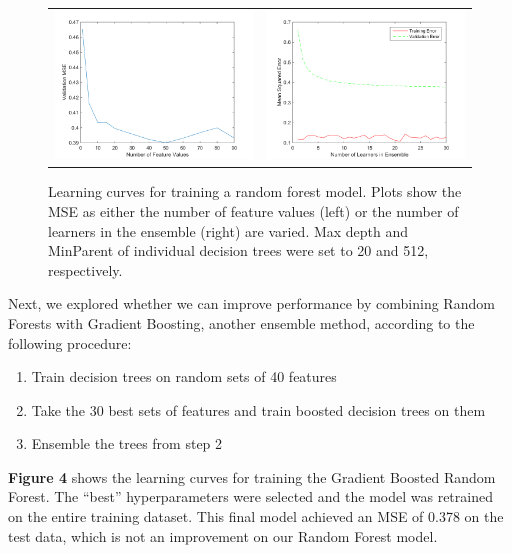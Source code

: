 \documentclass[12pt] {article}
\renewcommand{\baselinestretch}{1.2} %
\begin{document}
\renewcommand{\baselinestretch}{1.0} %
\begin{figure}[h!] \centering
\begin{tabular}{cc}
\includegraphics[width=.45\textwidth]{figdir/numFeatValuesVersusMSE.png} &
\includegraphics[width=.45\textwidth]{figdir/numLearnersVersusMSE.png} \\
\end{tabular}
\caption{Learning curves for training a random forest model. Plots show the MSE as either the number of feature values (left) or the number of learners in the ensemble (right) are varied. Max depth and MinParent of individual decision trees were set to 20 and 512, respectively.}
\end{figure}
\renewcommand{\baselinestretch}{1.2} %

Next, we explored whether we can improve performance by combining Random Forests with Gradient Boosting, another ensemble method, according to the following procedure:
\begin{enumerate}
\item Train decision trees on random sets of 40 features
\item Take the 30 best sets of features and train boosted decision trees on them
\item Ensemble the trees from step 2
\end{enumerate}

\textbf{Figure 4} shows the learning curves for training the Gradient Boosted Random Forest. The ``best'' hyperparameters were selected and the model was retrained on the entire training dataset. This final model achieved an MSE of 0.378 on the test data, which is not an improvement on our Random Forest model.
\end{document}
